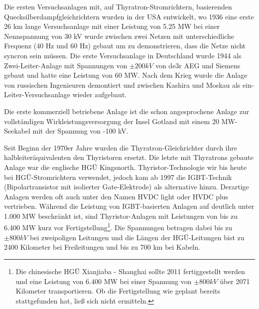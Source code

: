 Die ersten Versuchsanlagen mit, auf Thyratron-Stromrichtern, basierenden Quecksilberdampfgleichrichtern wurden in der USA entwickelt, wo 1936 eine erste 26 km lange Versuchsanlage mit einer Leistung von 5.25 MW bei einer Nennspannung von 30 kV wurde zwischen zwei Netzen mit unterschiedliche Frequenz (40 Hz und 60 Hz) gebaut um zu demonstrieren, dass die Netze nicht syncron sein müssen. Die erste Versuchsanlage in Deutschland wurde 1944 als Zwei-Leiter-Anlage mit Spannungen von $\pm 200 kV$ von de3r AEG und Siemens gebaut und hatte eine Leistung von 60 MW. Nach dem Krieg wurde die Anlage von russischen Ingenieuren demontiert und zwischen Kashira und Moskau als ein-Leiter-Versuchsanlage wieder aufgebaut.

Die erste kommerziell betriebene Anlage ist die schon angesprochene Anlage zur vollständigen Wirkleistungsversorgung der Insel Gotland mit einem 20 MW-Seekabel mit der Spannung von -100 kV.

Seit Beginn der 1970er Jahre wurden die Thyratron-Gleichrichter durch ihre halbleiteräquivalenten den Thyristoren ersetzt. Die letzte mit Thyratrons gebaute Anlage war die englische HGÜ Kingsnorth. Thyristor-Technologie wir bis heute bei HGÜ-Stromrichtern verwendet, jedoch kam ab 1997 die IGBT-Technik (Bipolartransistor mit isolierter Gate-Elektrode) als alternative hinzu. Derartige Anlagen werden oft auch unter den Namen HVDC light oder HVDC plus vertrieben.
Während die Leistung von IGBT-basierten Anlagen auf deutlich unter 1.000 MW beschränkt ist, sind Thyristor-Anlagen mit Leistungen von bis zu 6.400 MW kurz vor Fertigstellung\footnote{Die chinesische HGÜ Xianjiaba - Shanghai sollte 2011 fertiggestellt werden und eine Leistung von 6.400 MW bei einer Spannung von $\pm800 kV$ über 2071 Kilometer transportieren. Ob die Fertigstellung wie geplant bereits stattgefunden hat, ließ sich nicht ermitteln.}. Die Spannungen betragen dabei bis zu $\pm800 kV$ bei zweipoligen Leitungen und die Längen der HGÜ-Leitungen bist zu 2400 Kilometer bei Freileitungen und bis zu 700 km bei Kabeln.\cite{Liste}



